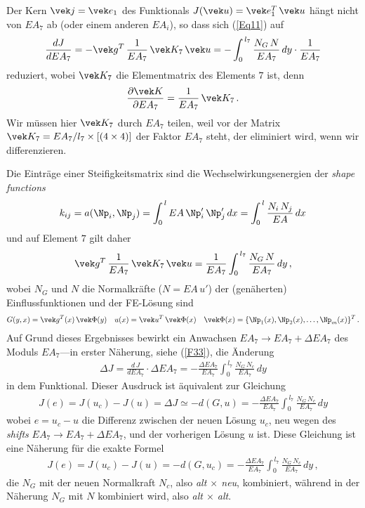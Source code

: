 {{{{{Der Kern  $\vek j = \vek e_1$ des Funktionals $J(\vek u) = \vek e_1^T\,\vek u$ h\"{a}ngt nicht von $EA_7$ ab (oder einem anderen $EA_i$), so dass sich (\ref{Eq11}) auf
\begin{align} \label{F33}
\frac{d J}{d EA_7} =- \vek g^T\,\frac{1}{EA_7}\,\vek K_7\,\vek u =  - \int_0^{\,l_7}  \frac{N_G\,N}{EA_7}\,dy \cdot \frac{1}{EA_7}
\end{align}
reduziert, wobei $\vek K_7$ die Elementmatrix des Elements $ 7$ ist, denn
\begin{align}
\frac{\partial \vek K}{\partial EA_7} = \frac{1}{EA_7}\,\vek K_7\,.
\end{align}
Wir m\"{u}ssen hier $\vek K_7$ durch $EA_7$ teilen, weil vor der Matrix $\vek K_7 = EA_7/l_7 \times [(4 \times 4)]$ der Faktor $EA_7$ steht, der eliminiert wird, wenn wir differenzieren.

Die Eintr\"{a}ge einer Steifigkeitsmatrix sind die Wechselwirkungsenergien der {\em shape functions\/}
\begin{align}
k_{ij} = a(\Np_i,\Np_j) = \int_0^{\,l} EA\,\Np_i'\,\Np_j'\,dx = \int_0^{\,l} \frac{N_i\,N_j}{EA}\,dx
\end{align}
und auf Element $7$ gilt daher
\begin{align}
\vek g^T\,\frac{1}{EA_7}\,\vek K_7\,\vek u = \frac{1}{EA_7}\int_0^{\,l_7} \frac{N_G\,N}{EA_7}\,dy\,,
\end{align}
wobei $N_G$ und $N$ die Normalkr\"{a}fte ($N = EA\,u'$) der (gen\"{a}herten) Einflussfunktionen und der FE-L\"{o}sung sind
\begin{align}
G(y,x) = \vek g^T(x)\,\vek \Phi(y) \quad u(x) = \vek u^T\,\vek \Phi(x) \quad \vek \Phi(x) = \{\Np_1(x), \Np_2(x), \ldots, \Np_m(x)\}^T\,.
\end{align}
Auf Grund dieses Ergebnisses bewirkt ein Anwachsen $EA_7 \to EA_7 + \Delta EA_7$ des
Moduls $EA_7$---in erster N\"{a}herung, siehe (\ref{F33}), die \"{A}nderung
\begin{align}
\Delta J = \frac{d\,J}{d EA_7} \cdot \Delta EA_7 = - \frac{\Delta EA_7}{EA_7} \int_0^{\,l_7} \frac{N_G \,N_c}{EA_7}\,dy
\end{align}
in dem Funktional. Dieser Ausdruck ist \"{a}quivalent zur Gleichung
\begin{align}
J(e) = J(u_c) - J(u) = \Delta J \simeq - d(G,u) = - \frac{\Delta EA_7}{EA_7}\int_0^{\,l_7} \frac{N_G \,N_c}{EA_7}\,dy
\end{align}
wobei $e = u_c - u$ die Differenz zwischen der neuen L\"{o}sung $u_c$, neu wegen des {\em shifts\/} $EA_7 \to EA_7 + \Delta EA_7$, und der vorherigen L\"{o}sung $u$ ist. Diese Gleichung ist eine N\"{a}herung f\"{u}r die exakte Formel
\begin{align}
J(e) = J(u_c) - J(u) = - d(G, u_c) = -\frac{\Delta EA_7}{EA_7}\int_0^{\,l_7} \frac{N_G \,N_c}{EA_7}\,dy\,,
\end{align}
die $N_G$ mit der neuen Normalkraft $N_c$, also {\em alt $\times$ neu\/}, kombiniert, w\"{a}hrend in der N\"{a}herung $N_G$ mit $N$ kombiniert wird, also {\em alt $\times$ alt\/}.\\

}}}}}
